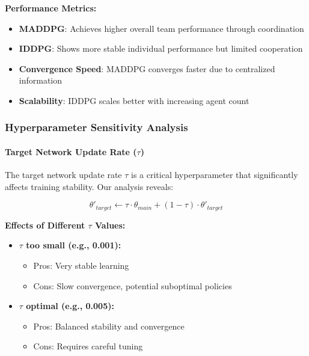 \documentclass[conference]{IEEEtran}
\begin{document}
{{\textbf{Performance Metrics:}
\begin{itemize}
    \item \textbf{MADDPG}: Achieves higher overall team performance through coordination
    \item \textbf{IDDPG}: Shows more stable individual performance but limited cooperation
    \item \textbf{Convergence Speed}: MADDPG converges faster due to centralized information
    \item \textbf{Scalability}: IDDPG scales better with increasing agent count
\end{itemize}

\subsubsection{Hyperparameter Sensitivity Analysis}

\paragraph{Target Network Update Rate ($\tau$)}

The target network update rate $\tau$ is a critical hyperparameter that significantly affects training stability. Our analysis reveals:

\begin{equation}
\theta'_{target} \leftarrow \tau \cdot \theta_{main} + (1-\tau) \cdot \theta'_{target}
\end{equation}

\textbf{Effects of Different $\tau$ Values:}

\begin{itemize}
    \item \textbf{$\tau$ too small (e.g., 0.001):} 
    \begin{itemize}
        \item Pros: Very stable learning
        \item Cons: Slow convergence, potential suboptimal policies
    \end{itemize}
    
    \item \textbf{$\tau$ optimal (e.g., 0.005):}
    \begin{itemize}
        \item Pros: Balanced stability and convergence
        \item Cons: Requires careful tuning
    \end{itemize}
    

\end{itemize}}}
\end{document}
